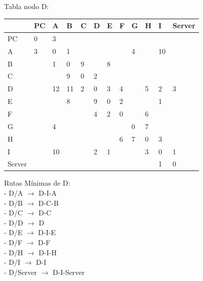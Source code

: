 \documentclass[a4paper]{article}
\begin{document}
\begin{table}[ht]
Tabla nodo D:\\
\begin{tabular}{|l|l|l|l|l|l|l|l|l|l|l|l|}
\hline
       & PC & A  & B  & C & D & E & F & G & H & I  & Server \\ \hline
PC     & 0  & 3  &    &   &   &   &   &   &   &    &        \\ \hline
A      & 3  & 0  & 1  &   &   &   &   & 4 &   & 10 &        \\ \hline
B      &    & 1  & 0  & 9 &   & 8 &   &   &   &    &        \\ \hline
C      &    &    & 9  & 0 & 2 &   &   &   &   &    &        \\ \hline
D      &    & 12 & 11 & 2 & 0 & 3 & 4 &   & 5 & 2  & 3      \\ \hline
E      &    &    & 8  &   & 9 & 0 & 2 &   &   & 1  &        \\ \hline
F      &    &    &    &   & 4 & 2 & 0 &   & 6 &    &        \\ \hline
G      &    & 4  &    &   &   &   &   & 0 & 7 &    &        \\ \hline
H      &    &    &    &   &   &   & 6 & 7 & 0 & 3  &        \\ \hline
I      &    & 10 &    &   & 2 & 1 &   &   & 3 & 0  & 1      \\ \hline
Server &    &    &    &   &   &   &   &   &   & 1  & 0      \\ \hline
\end{tabular}

Rutas Mínimas de D:\\
-	D/A  $\rightarrow$  D-I-A\\
-	D/B  $\rightarrow$  D-C-B\\
-	D/C  $\rightarrow$  D-C\\
-	D/D  $\rightarrow$  D\\
-	D/E  $\rightarrow$  D-I-E\\
-	D/F  $\rightarrow$  D-F\\
-	D/H  $\rightarrow$  D-I-H\\
-	D/I  $\rightarrow$  D-I\\
-	D/Server  $\rightarrow$  D-I-Server\\
\end{table}
\end{document}
